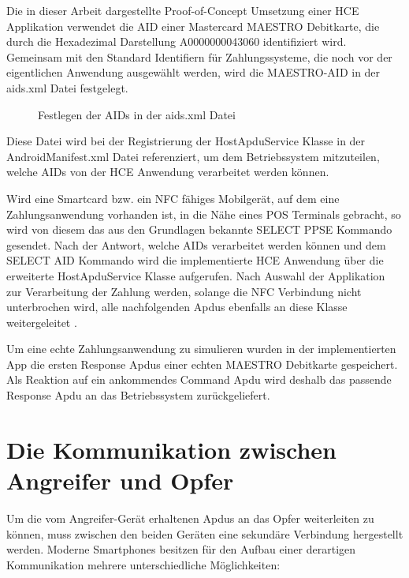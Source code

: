Die in dieser Arbeit dargestellte Proof-of-Concept Umsetzung einer HCE Applikation verwendet die AID einer Mastercard MAESTRO Debitkarte, die durch die Hexadezimal Darstellung A0000000043060 identifiziert wird. Gemeinsam mit den Standard Identifiern für Zahlungssysteme, die noch vor der eigentlichen Anwendung ausgewählt werden, wird die MAESTRO-AID in der aids.xml Datei festgelegt. 

\begin{figure}
	\caption{Festlegen der AIDs in der aids.xml Datei}
\end{figure}

Diese Datei wird bei der Registrierung der HostApduService Klasse in der AndroidManifest.xml Datei referenziert, um dem Betriebssystem mitzuteilen, welche AIDs von der HCE Anwendung verarbeitet werden können. 

Wird eine Smartcard bzw. ein NFC fähiges Mobilgerät, auf dem eine Zahlungsanwendung vorhanden ist, in die Nähe eines POS Terminals gebracht, so wird von diesem das aus den Grundlagen bekannte SELECT PPSE Kommando gesendet. Nach der Antwort, welche AIDs verarbeitet werden können und dem SELECT AID Kommando wird die implementierte HCE Anwendung über die erweiterte HostApduService Klasse aufgerufen. 
Nach Auswahl der Applikation zur Verarbeitung der Zahlung werden, solange die NFC Verbindung nicht unterbrochen wird, alle nachfolgenden Apdus ebenfalls an diese Klasse weitergeleitet \cite{androidHce}. 

Um eine echte Zahlungsanwendung zu simulieren wurden in der implementierten App die ersten Response Apdus einer echten MAESTRO Debitkarte gespeichert. Als Reaktion auf ein ankommendes Command Apdu wird deshalb das passende Response Apdu an das Betriebssystem zurückgeliefert. 

\section{Die Kommunikation zwischen Angreifer und Opfer}

Um die vom Angreifer-Gerät erhaltenen Apdus an das Opfer weiterleiten zu können, muss zwischen den beiden Geräten eine sekundäre Verbindung hergestellt werden. Moderne Smartphones besitzen für den Aufbau einer derartigen Kommunikation mehrere unterschiedliche Möglichkeiten:

